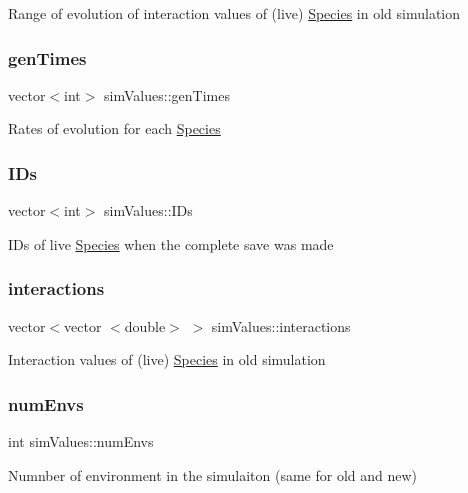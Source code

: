 Range of evolution of interaction values of (live) \hyperlink{classSpecies}{Species} in old simulation \mbox{\label{structsimValues_a0c396a3dc37a1ecf668cbf0d6f52305f}} 
\subsubsection{\texorpdfstring{gen\+Times}{genTimes}}
{\footnotesize\ttfamily vector$<$int$>$ sim\+Values\+::gen\+Times}

Rates of evolution for each \hyperlink{classSpecies}{Species} \mbox{\label{structsimValues_afe2312ca2bca46eac7a108d1aa9c88f0}} 
\subsubsection{\texorpdfstring{I\+Ds}{IDs}}
{\footnotesize\ttfamily vector$<$int$>$ sim\+Values\+::\+I\+Ds}

I\+Ds of live \hyperlink{classSpecies}{Species} when the complete save was made \mbox{\label{structsimValues_afacf91cde42df4983ac4640c6fe78470}} 
\subsubsection{\texorpdfstring{interactions}{interactions}}
{\footnotesize\ttfamily vector$<$vector $<$double$>$ $>$ sim\+Values\+::interactions}

Interaction values of (live) \hyperlink{classSpecies}{Species} in old simulation \mbox{\label{structsimValues_ae28b0e24d2b560548b1f4ba0eea035ee}} 
\subsubsection{\texorpdfstring{num\+Envs}{numEnvs}}
{\footnotesize\ttfamily int sim\+Values\+::num\+Envs}

Numnber of environment in the simulaiton (same for old and new) \mbox{\label{structsimValues_a409841bd1a747a200c99c86bfd11a78a}} 
